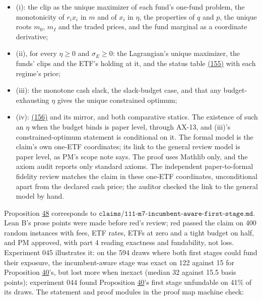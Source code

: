 \documentclass[11pt]{article}
\begin{document}
\begin{itemize}
  \item (i): the clip as the unique maximizer of each fund's one-fund problem,
  the monotonicity of \(r_ix_i\) in \(m\) and of \(x_i\) in \(\eta\), the properties of \(q\)
  and \(p\), the unique roots \(m_0\), \(m_I\) and the traded prices, and the fund
  marginal as a coordinate derivative;
  \item (ii), for every \(\eta\geq0\) and \(\sigma_E\geq0\): the Lagrangian's unique maximizer, the
  funds' clips and the ETF's holding at it, and the status table \hyperref[eq:155]{(155)}
  with each regime's price;
  \item (iii): the monotone cash slack, the slack-budget case, and that any
  budget-exhausting \(\eta\) gives the unique constrained optimum;
  \item (iv): \hyperref[eq:156]{(156)} and its mirror, and both comparative statics.
The existence of such an \(\eta\) when the budget binds is paper level,
through AX-13, and (iii)'s constrained-optimum statement is conditional
on it. The formal model is the claim's own one-ETF coordinates; its link
to the general review model is paper level, as PM's scope note says.
The proof uses Mathlib only, and the axiom audit reports only standard
axioms. The independent paper-to-formal fidelity review matches the
claim in these one-ETF coordinates, unconditional apart from the
declared cash price; the auditor checked the link to the general model
by hand.
\end{itemize}

Proposition \hyperref[res:Proposition-48]{48} corresponds to
\(\texttt{claims/111-m7-incumbent-aware-first-stage.md}\). Lean B's prose
points were made before red's review; red passed the claim on 400 random
instances with fees, ETF rates, ETFs at zero and a tight budget on half,
and PM approved, with part 4 reading exactness and fundability, not
loss. Experiment 045 illustrates it: on the 594 draws where both first
stages could fund their exposure, the incumbent-aware stage was exact on
122 against 15 for Proposition \hyperref[res:Proposition-40]{40}'s, but lost more when inexact (median
32 against 15.5 basis points); experiment 044 found Proposition \hyperref[res:Proposition-40]{40}'s
first stage unfundable on 41\% of its draws. The statement and proof
modules in the proof map machine check:
\end{document}
